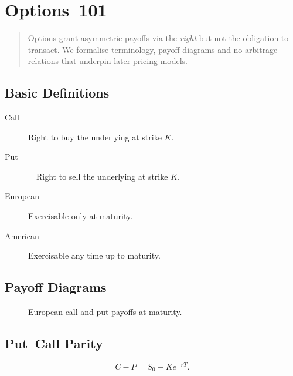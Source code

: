 \chapter{Options 101}\label{ch:options101}

\begin{abstract}
Options grant asymmetric payoffs via the \emph{right} but not the
obligation to transact.  We formalise terminology, payoff diagrams and
no‑arbitrage relations that underpin later pricing models.
\end{abstract}

\section{Basic Definitions}

\begin{description}
  \item[Call] Right to buy the underlying at strike \(K\).
  \item[Put]  Right to sell the underlying at strike \(K\).
  \item[European] Exercisable only at maturity.
  \item[American] Exercisable any time up to maturity.
\end{description}

\section{Payoff Diagrams}

\begin{figure}[h]
  \centering
  \caption{European call and put payoffs at maturity.}
  \label{fig:callput}
\end{figure}

\section{Put–Call Parity}

\[
C - P = S_0 - K e^{-rT}.
\]

